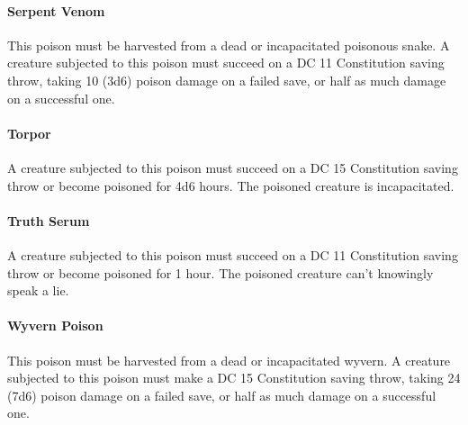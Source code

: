     \paragraph{Serpent Venom}
        This poison must be harvested from a dead or incapacitated poisonous snake.
        A creature subjected to this poison must succeed on a DC 11 Constitution saving throw, taking 10 (3d6) poison damage on a failed save, or half as much damage on a successful one.
    \paragraph{Torpor}
        A creature subjected to this poison must succeed on a DC 15 Constitution saving throw or become poisoned for 4d6 hours.
        The poisoned creature is incapacitated.
    \paragraph{Truth Serum}
        A creature subjected to this poison must succeed on a DC 11 Constitution saving throw or become poisoned for 1 hour.
        The poisoned creature can't knowingly speak a lie.
    \paragraph{Wyvern Poison}
        This poison must be harvested from a dead or incapacitated wyvern.
        A creature subjected to this poison must make a DC 15 Constitution saving throw, taking 24 (7d6) poison damage on a failed save, or half as much damage on a successful one.
\newpage~\newpage
